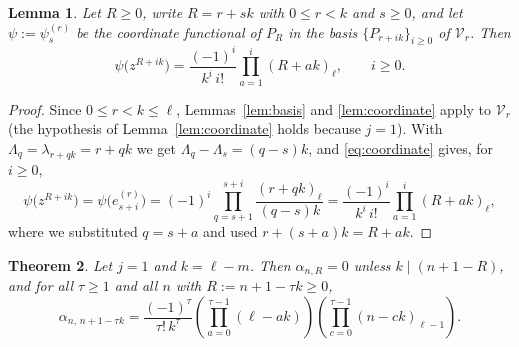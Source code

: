 \documentclass{amsart}
\newtheorem{theorem}{Theorem}[section]
\newtheorem{lemma}[theorem]{Lemma}
\theoremstyle{definition}
\newcommand{\fall}[2]{(#1)_{#2}}
\begin{document}
\begin{lemma}\label{lem:coordinate-jone}
Let \(R\ge0\), write \(R=r+sk\) with \(0\le r<k\) and \(s\ge0\), and let
\(\psi:=\psi^{(r)}_s\) be the coordinate functional of \(P_R\) in the basis
\(\{P_{r+ik}\}_{i\ge0}\) of \(\mathcal V_r\).  Then
\begin{equation}\label{eq:psi-jone}
\psi\bigl(z^{R+ik}\bigr)
=\frac{(-1)^i}{k^i\,i!}\prod_{a=1}^{i}\fall{R+ak}{\ell},
\qquad i\ge0 .
\end{equation}
\end{lemma}

\begin{proof}
Since \(0\le r<k\le\ell\), Lemmas~\ref{lem:basis} and \ref{lem:coordinate}
apply to \(\mathcal V_r\) (the hypothesis of Lemma~\ref{lem:coordinate} holds
because \(j=1\)).  With \(\Lambda_q=\lambda_{r+qk}=r+qk\) we get
\(\Lambda_q-\Lambda_s=(q-s)k\), and \eqref{eq:coordinate} gives, for
\(i\ge0\),
\[
\psi\bigl(z^{R+ik}\bigr)
=\psi\bigl(e^{(r)}_{s+i}\bigr)
=(-1)^{i}\prod_{q=s+1}^{s+i}\frac{\fall{r+qk}{\ell}}{(q-s)k}
=\frac{(-1)^i}{k^i\,i!}\prod_{a=1}^{i}\fall{R+ak}{\ell},
\]
where we substituted \(q=s+a\) and used \(r+(s+a)k=R+ak\).
\end{proof}

\begin{theorem}\label{thm:jone}
Let \(j=1\) and \(k=\ell-m\).  Then \(\alpha_{n,R}=0\) unless
\(k\mid(n+1-R)\), and for all \(\tau\ge1\) and all \(n\) with
\(R:=n+1-\tau k\ge0\),
\begin{equation}\label{eq:closed-alpha}
\alpha_{n,\,n+1-\tau k}
=
\frac{(-1)^\tau}{\tau!\,k^\tau}
\left(\prod_{a=0}^{\tau-1}(\ell-ak)\right)
\left(\prod_{c=0}^{\tau-1}\fall{n-ck}{\ell-1}\right).
\end{equation}
\end{theorem}
\end{document}
